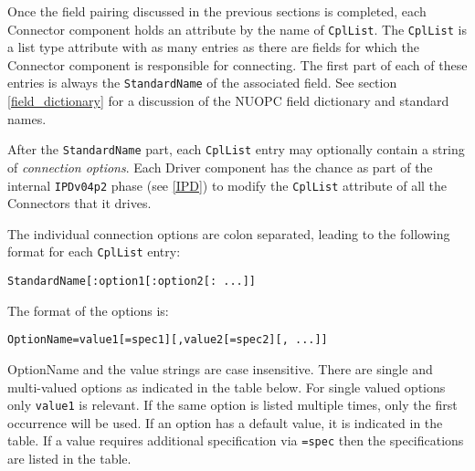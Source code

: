 %

\label{connection_options}

Once the field pairing discussed in the previous sections is completed, each Connector component holds an attribute by the name of {\tt CplList}. The {\tt CplList} is a list type attribute with as many entries as there are fields for which the Connector component is responsible for connecting. The first part of each of these entries is always the {\tt StandardName} of the associated field. See section \ref{field_dictionary} for a discussion of the NUOPC field dictionary and standard names.

After the {\tt StandardName} part, each {\tt CplList} entry may optionally contain a string of {\em connection options}. Each Driver component has the chance as part of the internal {\tt IPDv04p2} phase (see \ref{IPD}) to modify the {\tt CplList} attribute of all the Connectors that it drives.

The individual connection options are colon separated, leading to the following format for each {\tt CplList} entry:

\begin{verbatim}
StandardName[:option1[:option2[: ...]]
\end{verbatim}

The format of the options is:

\begin{verbatim}
OptionName=value1[=spec1][,value2[=spec2][, ...]]
\end{verbatim}

OptionName and the value strings are case insensitive. There are single and multi-valued options as indicated in the table below. For single valued options only {\tt value1} is relevant. If the same option is listed multiple times, only the first occurrence will be used. If an option has a default value, it is indicated in the table. If a value requires additional specification via {\tt =spec} then the specifications are listed in the table.

